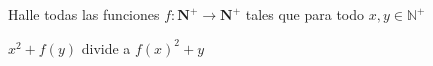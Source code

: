 \begin{problem}
	Halle todas las funciones $f: \mathbf{N}^{+} \to \mathbf{N}^{+}$ tales que para todo $x, y \in \mathbb{N}^{+}$
	\begin{center}
		$x^{2} + f(y)$ divide a $f(x)^{2}+y$
	\end{center}
\end{problem}